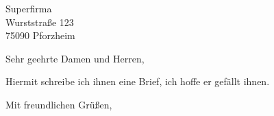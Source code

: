 \documentclass[
    foldmarks=on,         %
    paper=a4,             %
    fromphone=on,         %
    fromrule=off,         %
    fromfax=off,          %
    fromemail=on,         %
    fromurl=off,          %
    subject=beforeopening %
]{scrlttr2}
\begin{document}


\begin{letter}{%
Superfirma\\
Wurststraße 123\\
75090 Pforzheim
}

\opening{Sehr geehrte Damen und Herren,}

Hiermit schreibe ich ihnen eine Brief, ich hoffe er gefällt ihnen.

\closing{Mit freundlichen Grüßen,}

\end{letter}
\end{document}
